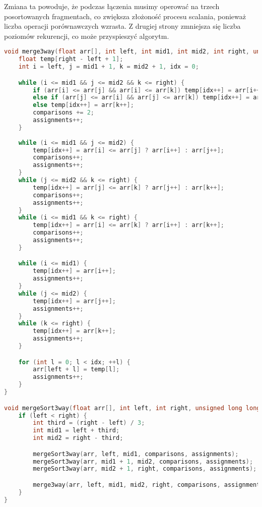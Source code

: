 \documentclass[a4paper,12pt]{article}
\begin{document}
Zmiana ta powoduje, że podczas łączenia musimy operować na trzech posortowanych fragmentach, co zwiększa złożoność procesu scalania, ponieważ liczba operacji porównawczych wzrasta. Z drugiej strony zmniejsza się liczba poziomów rekurencji, co może przyspieszyć algorytm.
\newpage
\begin{lstlisting}[language=C++,caption=Merge Sort z podziałem na trzy części]
void merge3way(float arr[], int left, int mid1, int mid2, int right, unsigned long long& comparisons, unsigned long long& assignments) {
    float temp[right - left + 1];
    int i = left, j = mid1 + 1, k = mid2 + 1, idx = 0;

    while (i <= mid1 && j <= mid2 && k <= right) {
        if (arr[i] <= arr[j] && arr[i] <= arr[k]) temp[idx++] = arr[i++];
        else if (arr[j] <= arr[i] && arr[j] <= arr[k]) temp[idx++] = arr[j++];
        else temp[idx++] = arr[k++];
        comparisons += 2;
        assignments++;
    }
    
    while (i <= mid1 && j <= mid2) {
        temp[idx++] = arr[i] <= arr[j] ? arr[i++] : arr[j++];
        comparisons++;
        assignments++;
    }
    while (j <= mid2 && k <= right) {
        temp[idx++] = arr[j] <= arr[k] ? arr[j++] : arr[k++];
        comparisons++;
        assignments++;
    }
    while (i <= mid1 && k <= right) {
        temp[idx++] = arr[i] <= arr[k] ? arr[i++] : arr[k++];
        comparisons++;
        assignments++;
    }

    while (i <= mid1) {
        temp[idx++] = arr[i++];
        assignments++;
    }
    while (j <= mid2) {
        temp[idx++] = arr[j++];
        assignments++;
    }
    while (k <= right) {
        temp[idx++] = arr[k++];
        assignments++;
    }

    for (int l = 0; l < idx; ++l) {
        arr[left + l] = temp[l];
        assignments++;
    }
}

void mergeSort3way(float arr[], int left, int right, unsigned long long& comparisons, unsigned long long& assignments) {
    if (left < right) {
        int third = (right - left) / 3;
        int mid1 = left + third;
        int mid2 = right - third;

        mergeSort3way(arr, left, mid1, comparisons, assignments);
        mergeSort3way(arr, mid1 + 1, mid2, comparisons, assignments);
        mergeSort3way(arr, mid2 + 1, right, comparisons, assignments);

        merge3way(arr, left, mid1, mid2, right, comparisons, assignments);
    }
}
\end{lstlisting}
\end{document}
